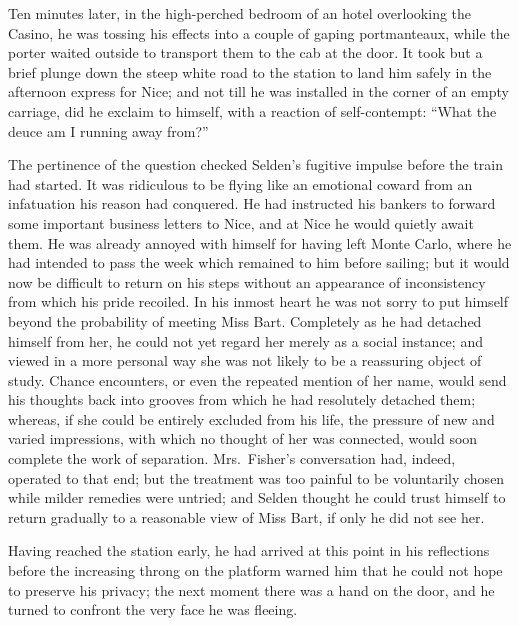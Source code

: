 \documentclass[12pt,a4paper]{book}
\begin{document}
Ten minutes later, in the high-perched bedroom of an hotel
overlooking the Casino, he was tossing his effects into a couple
of gaping portmanteaux, while the porter waited outside to
transport them to the cab at the door. It took but a brief plunge
down the steep white road to the station to land him safely in
the afternoon express for Nice; and not till he was installed in
the corner of an empty carriage, did he exclaim to himself, with
a reaction of self-contempt: ``What the deuce am I running away
from?''





The pertinence of the question checked Selden's fugitive impulse
before the train had started. It was ridiculous to be flying like
an emotional coward from an infatuation his reason had conquered. 
He had instructed his bankers to forward some important business
letters to Nice, and at Nice he would quietly await them. He was
already annoyed with himself for having left Monte Carlo, where
he had intended to pass the week which remained to him before
sailing; but it would now be difficult to return on his steps
without an appearance of inconsistency from which his pride
recoiled. In his inmost heart he was not sorry to put himself
beyond the probability of meeting Miss Bart. Completely as he had
detached himself from her, he could not yet regard her merely as a
social instance; and viewed in a more personal way she was not
likely to be a reassuring object of study. Chance encounters, or
even the repeated mention of her name, would send his thoughts
back into grooves from which he had resolutely detached them;
whereas, if she could be entirely excluded from his life, the
pressure of new and varied impressions, with which no thought of
her was connected, would soon complete the work of separation. 
Mrs.\ Fisher's conversation had, indeed, operated to that end; but
the treatment was too painful to be voluntarily chosen while
milder remedies were untried; and Selden thought he could trust
himself to return gradually to a reasonable view of Miss Bart, if
only he did not see her.





Having reached the station early, he had arrived at this point in
his reflections before the increasing throng on the platform
warned him that he could not hope to preserve his privacy; the
next moment there was a hand on the door, and he turned to
confront the very face he was fleeing.
\end{document}
